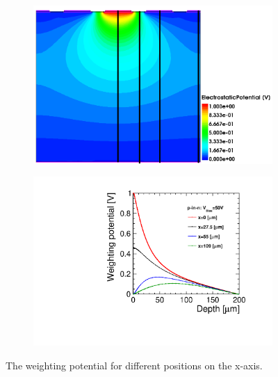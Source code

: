 \begin{figure}[htbp]
  \centering
  \begin{subfigure}[b]{0.49\textwidth}
    \centering
    \includegraphics[width=\textwidth]{figures/Ramo/RamoPotential_cuts.png}
    \caption{}\label{fig:RamoPotentialCuts}
  \end{subfigure}\hfill
  \begin{subfigure}[b]{0.49\textwidth}
    \centering
    \includegraphics[width=\textwidth]{figures/Ramo/WeightingPotential_1D.pdf}
    \caption{}\label{fig:RamoPotentialCuts1D}
  \end{subfigure} 
  \caption{The weighting potential for different positions on the x-axis.}\label{fig:RamoTCADCuts}
\end{figure}




